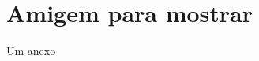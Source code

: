 \documentclass[12pt,twoside,oneright,a4paper,chapter=TITLE,english,brazil]{unipampa}
\begin{document}
\anexos                         %

\chapter{Amigem para mostrar}
    Um anexo

    
%
\printindex             %
\end{document}
